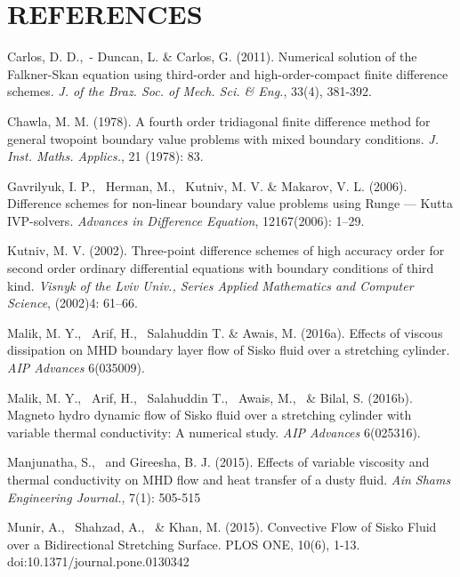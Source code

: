 \documentclass[12pt]{report}
\newcommand{\tti}[1]{\textit{#1}}
\begin{document}
	\chapter*{REFERENCES}
	\begin{description}
		\item Carlos, D. D.,~- Duncan, L. \& Carlos, G. (2011). Numerical solution of the Falkner-Skan equation using third-order and high-order-compact finite difference schemes. \tti{J. of the Braz. Soc. of Mech. Sci. \& Eng.}, 33(4), 381-392.
		
		
		\item Chawla, M. M. (1978). A fourth order tridiagonal finite difference method for general twopoint boundary value problems with mixed boundary conditions. \textit{J. Inst. Maths. Applics.},
		21 (1978): 83.
		
		
		\item Gavrilyuk, I. P., ~Herman, M., ~Kutniv, M. V. \& Makarov, V. L. (2006). Difference schemes for non-linear boundary value problems using Runge — Kutta IVP-solvers. \textit{Advances in Difference Equation}, 12167(2006): 1–29.
		
		
		\item Kutniv, M. V. (2002). Three-point difference schemes of high accuracy order for second order ordinary differential equations with boundary conditions of third kind. \textit{Visnyk of the Lviv Univ., Series Applied Mathematics and Computer Science}, (2002)4: 61–66.
		
		
		\item Malik, M. Y., ~Arif, H., ~Salahuddin T. \& Awais, M. (2016a). Effects of viscous dissipation on MHD boundary layer flow of Sisko fluid over a stretching cylinder. \textit{AIP Advances} 6(035009).
		
		
		\item Malik, M. Y., ~Arif, H., ~Salahuddin T., ~Awais, M., ~\& Bilal, S. (2016b). Magneto hydro dynamic flow of Sisko fluid over a stretching cylinder with variable thermal conductivity: A numerical study. \textit{AIP Advances} 6(025316).
		
		
		\item Manjunatha, S., ~and Gireesha, B. J. (2015). Effects of variable viscosity and thermal conductivity on MHD flow and heat transfer of a dusty fluid. \textit{Ain Shams Engineering Journal.}, 7(1): 505-515
		
		
		\item Munir, A., ~Shahzad, A., ~\& Khan, M. (2015). Convective Flow of Sisko Fluid over a Bidirectional Stretching Surface. PLOS ONE, 10(6), 1-13. doi:10.1371/journal.pone.0130342
		

\end{description}
\end{document}
